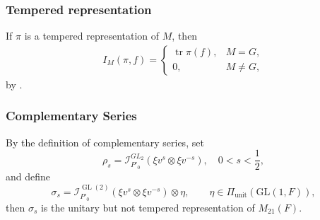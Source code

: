 \documentclass[11pt]{amsart}
\renewcommand{\rm}{\mathrm}
\newcommand{\GGL}{\mathrm{GL}}
\theoremstyle{definition}
\numberwithin{equation}{section}
\begin{document}
	\subsubsection{Tempered representation}
	If \(\pi\) is a tempered representation of \(M\), then
	\begin{align}\label{tem}
			I_M(\pi, f) = 
		\begin{cases}
			\operatorname{tr} \pi(f), & M = G, \\
			0, & M \neq G,
		\end{cases}
	\end{align}
by \cite{Art81}.
	\subsubsection{Complementary Series}
	By the definition of complementary series, set \[
	\rho_s = \mathscr{I}_{P'_0}^{GL_2} \left( \xi v^s \otimes \xi v^{-s} \right), \quad 0 < s < \frac{1}{2},
	\]and define 
	\[\sigma_s = \mathscr{I}_{P'_0}^{\operatorname{GL}(2)} (\xi v^s \otimes \xi v^{-s}) \otimes \eta,\qquad \eta\in\Pi_{\rm{unit}}(\GGL(1,F)),\]then \(\sigma_s\) is the unitary but not tempered representation of \(M_{21}(F)\).
	
\end{document}
